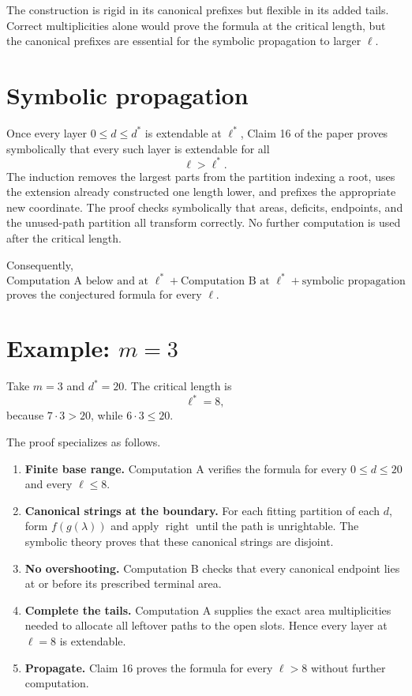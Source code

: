 \documentclass{article}
\begin{document}
The construction is rigid in its canonical prefixes but flexible in its added
tails.  Correct multiplicities alone would prove the formula at the critical
length, but the canonical prefixes are essential for the symbolic propagation
to larger \(\ell\).

\section{Symbolic propagation}

Once every layer \(0\leq d\leq d^*\) is extendable at \(\ell^*\), Claim 16
of the paper proves symbolically that every such layer is extendable for all
\[
  \ell>\ell^*.
\]
The induction removes the largest parts from the partition indexing a root,
uses the extension already constructed one length lower, and prefixes the
appropriate new coordinate.  The proof checks symbolically that areas,
deficits, endpoints, and the unused-path partition all transform correctly.
No further computation is used after the critical length.

Consequently,
\[
  \text{Computation A below and at }\ell^*
  +
  \text{Computation B at }\ell^*
  +
  \text{symbolic propagation}
\]
proves the conjectured formula for every \(\ell\).

\section{Example: \(m=3\)}

Take \(m=3\) and \(d^*=20\).  The critical length is
\[
  \ell^*=8,
\]
because \(7\cdot3>20\), while \(6\cdot3\leq20\).

The proof specializes as follows.
\begin{enumerate}
\item \textbf{Finite base range.}  Computation A verifies the formula for
      every \(0\leq d\leq20\) and every \(\ell\leq8\).
\item \textbf{Canonical strings at the boundary.}  For each fitting partition
      of each \(d\), form \(f(g(\lambda))\) and apply
      \(\operatorname{right}\) until the path is unrightable.  The symbolic
      theory proves that these canonical strings are disjoint.
\item \textbf{No overshooting.}  Computation B checks that every canonical
      endpoint lies at or before its prescribed terminal area.
\item \textbf{Complete the tails.}  Computation A supplies the exact area
      multiplicities needed to allocate all leftover paths to the open slots.
      Hence every layer at \(\ell=8\) is extendable.
\item \textbf{Propagate.}  Claim 16 proves the formula for every \(\ell>8\)
      without further computation.
\end{enumerate}
\end{document}
